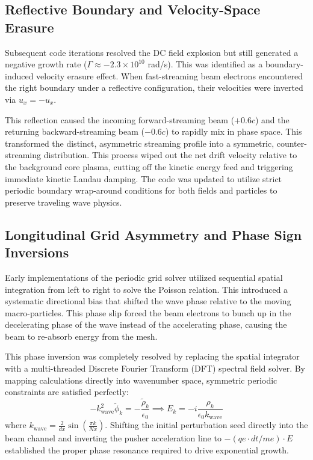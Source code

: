 \documentclass[11pt,a4paper]{article}
\begin{document}
\subsection{Reflective Boundary and Velocity-Space Erasure}
Subsequent code iterations resolved the DC field explosion but still generated a negative growth rate ($\Gamma \approx -2.3 \times 10^{10}$ rad/s). This was identified as a boundary-induced velocity erasure effect. When fast-streaming beam electrons encountered the right boundary under a reflective configuration, their velocities were inverted via $u_x = -u_x$. 

This reflection caused the incoming forward-streaming beam ($+0.6c$) and the returning backward-streaming beam ($-0.6c$) to rapidly mix in phase space. This transformed the distinct, asymmetric streaming profile into a symmetric, counter-streaming distribution. This process wiped out the net drift velocity relative to the background core plasma, cutting off the kinetic energy feed and triggering immediate kinetic Landau damping. The code was updated to utilize strict periodic boundary wrap-around conditions for both fields and particles to preserve traveling wave physics.

\subsection{Longitudinal Grid Asymmetry and Phase Sign Inversions}
Early implementations of the periodic grid solver utilized sequential spatial integration from left to right to solve the Poisson relation. This introduced a systematic directional bias that shifted the wave phase relative to the moving macro-particles. This phase slip forced the beam electrons to bunch up in the decelerating phase of the wave instead of the accelerating phase, causing the beam to re-absorb energy from the mesh. 

This phase inversion was completely resolved by replacing the spatial integrator with a multi-threaded Discrete Fourier Transform (DFT) spectral field solver. By mapping calculations directly into wavenumber space, symmetric periodic constraints are satisfied perfectly:
\begin{equation}
-k_{\text{wave}}^2 \tilde{\phi}_k = -\frac{\tilde{\rho}_k}{\epsilon_0} \implies E_k = -i \frac{\rho_k}{\epsilon_0 k_{\text{wave}}}
\end{equation}
where $k_{\text{wave}} = \frac{2}{dx}\sin(\frac{\pi k}{Nx})$. Shifting the initial perturbation seed directly into the beam channel and inverting the pusher acceleration line to $- (qe \cdot dt / me) \cdot E$ established the proper phase resonance required to drive exponential growth.
\end{document}
